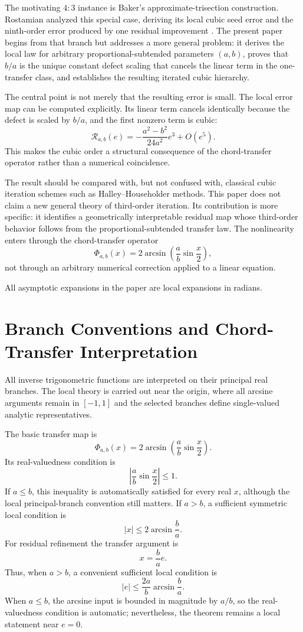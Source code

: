 \documentclass[11pt]{article}
\theoremstyle{definition}
\theoremstyle{remark}
\newcommand{\Rop}{\mathscr{R}}
\newcommand{\Phiop}{\Phi}
\begin{document}
The motivating $4:3$ instance is Baker's approximate-trisection
construction. Rostamian analyzed this special case, deriving its local cubic
seed error and the ninth-order error produced by one residual improvement
\cite{RostamianBaker}. The present paper begins from that branch but addresses
a more general problem: it derives the local law for arbitrary
proportional-subtended parameters $(a,b)$, proves that $b/a$ is the unique
constant defect scaling that cancels the linear term in the one-transfer
class, and establishes the resulting iterated cubic hierarchy.

The central point is not merely that the resulting error is small.  The local
error map can be computed explicitly.  Its linear term cancels identically
because the defect is scaled by $b/a$, and the first nonzero term is cubic:
\[
\Rop_{a,b}(e)
=
-
\frac{a^2-b^2}{24a^2}e^3+O(e^5).
\]
This makes the cubic order a structural consequence of the chord-transfer
operator rather than a numerical coincidence.

The result should be compared with, but not confused with, classical cubic
iteration schemes such as Halley--Householder methods.  This paper does not
claim a new general theory of third-order iteration.  Its contribution is
more specific: it identifies a geometrically interpretable residual map whose
third-order behavior follows from the proportional-subtended transfer law.
The nonlinearity enters through the chord-transfer operator
\[
\Phiop_{a,b}(x)
=
2\arcsin\!\left(
\frac{a}{b}\sin\frac{x}{2}
\right),
\]
not through an arbitrary numerical correction applied to a linear equation.

All asymptotic expansions in the paper are local expansions in radians.

\section{Branch Conventions and Chord-Transfer Interpretation}
\label{sec:branch-conventions}

All inverse trigonometric functions are interpreted on their principal real
branches.  The local theory is carried out near the origin, where all arcsine
arguments remain in $[-1,1]$ and the selected branches define single-valued
analytic representatives.

The basic transfer map is
\[
\Phiop_{a,b}(x)
=
2\arcsin\!\left(
\frac{a}{b}\sin\frac{x}{2}
\right).
\]
Its real-valuedness condition is
\[
\left|
\frac{a}{b}\sin\frac{x}{2}
\right|
\le 1.
\]
If $a\le b$, this inequality is automatically satisfied for every real $x$,
although the local principal-branch convention still matters.  If $a>b$, a
sufficient symmetric local condition is
\[
|x|
\le
2\arcsin\frac{b}{a}.
\]
For residual refinement the transfer argument is
\[
x=\frac{b}{a}e.
\]
Thus, when $a>b$, a convenient sufficient local condition is
\[
|e|
\le
\frac{2a}{b}\arcsin\frac{b}{a}.
\]
When $a\le b$, the arcsine input is bounded in magnitude by $a/b$, so the
real-valuedness condition is automatic; nevertheless, the theorem remains a
local statement near $e=0$.
\end{document}
